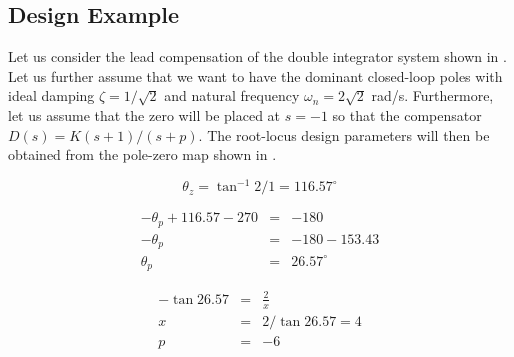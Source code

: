 \subsection*{Design Example}

Let us consider the lead compensation of the double integrator system shown in . Let us further assume that we want to have the dominant closed-loop poles with ideal damping $\zeta=1/\sqrt{2}$ and natural frequency $\omega_n = 2\sqrt{2}$ rad/s. Furthermore, let us assume that the zero will be placed at $s=-1$ so that the compensator $D(s) = K(s+1)/(s+p)$. The root-locus design parameters will then be obtained from the pole-zero map shown in .

$$\theta_z = \tan^{-1} 2/1 = 116.57^\circ$$

\begin{eqnarray*}
	-\theta_p + 116.57 -270 & = & -180 \\
	-\theta_p & = & -180 - 153.43 \\
	\theta_p & = & 26.57^\circ
\end{eqnarray*}

\begin{eqnarray*}
	-\tan 26.57 & = & \frac{2}{x} \\
	x & = & 2/\tan 26.57 = 4 \\
	p & = & -6
\end{eqnarray*}


\begin{slide}
	\label{slides:ex1-1}
\end{slide}

\begin{slide}\label{slides:ex1-2}
\end{slide}

